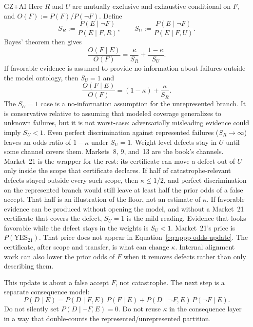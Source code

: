 \begin{authbar}{GZ+AI}
Here $R$ and $U$ are mutually exclusive and exhaustive conditional on $F$, and $O(F):=P(F)/P(\neg F)$.
Define
\[
S_R := \frac{P(E\mid \neg F)}{P(E\mid F,R)},
\qquad
S_U := \frac{P(E\mid \neg F)}{P(E\mid F,U)}.
\]
Bayes' theorem then gives
\begin{equation}
\label{eq:appp-odds-update}
\frac{O(F\mid E)}{O(F)}
=
\frac{\kappa}{S_R}
+
\frac{1-\kappa}{S_U}.
\end{equation}
If favorable evidence is assumed to provide no information about failures outside the model ontology, then $S_U=1$ and
\begin{equation}
\label{eq:appp-odds-update-su1}
\frac{O(F\mid E)}{O(F)}
=
(1-\kappa)+\frac{\kappa}{S_R}.
\end{equation}
The $S_U=1$ case is a no-information assumption for the unrepresented branch.
It is conservative relative to assuming that modeled coverage generalizes to unknown failures, but it is not worst-case: adversarially misleading evidence could imply $S_U<1$.
Even perfect discrimination against represented failures ($S_R\to\infty$) leaves an odds ratio of $1-\kappa$ under $S_U=1$.
Weight-level defects stay in $U$ until some channel covers them.
Markets~8, 9, and~13 are the book's channels.
Market~21 is the wrapper for the rest: its certificate can move a defect out of $U$ only inside the scope that certificate declares.
If half of catastrophe-relevant defects stayed outside every such scope, then $\kappa\le 1/2$, and perfect discrimination on the represented branch would still leave at least half the prior odds of a false accept.
That half is an illustration of the floor, not an estimate of $\kappa$.
If favorable evidence can be produced without opening the model, and without a Market~21 certificate that covers the defect, $S_U=1$ is the mild reading.
Evidence that looks favorable while the defect stays in the weights is $S_U<1$.
Market~21's price is $P(\mathrm{YES}_{21})$.
That price does not appear in Equation~\ref{eq:appp-odds-update}.
The certificate, after scope and transfer, is what can change $\kappa$.
Internal alignment work can also lower the prior odds of $F$ when it removes defects rather than only describing them.

This update is about a false accept $F$, not catastrophe.
The next step is a separate consequence model:
\[
P(D\mid E)
=
P(D\mid F,E)\,P(F\mid E)
+
P(D\mid \neg F,E)\,P(\neg F\mid E).
\]
Do not silently set $P(D\mid \neg F,E)=0$.
Do not reuse $\kappa$ in the consequence layer in a way that double-counts the represented/unrepresented partition.


\end{authbar}
